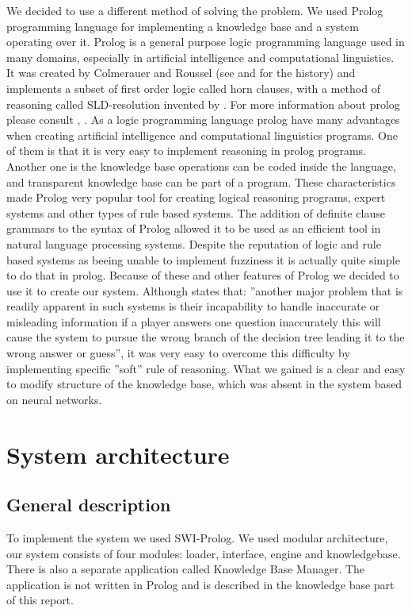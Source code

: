 \documentclass[a4paper]{article}
\begin{document}
We decided to use a different method of solving the problem. We used Prolog programming language for implementing a knowledge base and a system operating over it. Prolog is a general purpose logic programming language used in many domains, especially in artificial intelligence and computational linguistics. It was created by Colmerauer and Roussel (see \citet{Prolog} and \citet{LogicProgramming} for the history) and implements a subset of first order logic called horn clauses, with a method of reasoning called SLD-resolution invented by \citet{SLD}. For more information about prolog please consult \citet{ProgrammingInProlog}, \citet{PrologAI}. As a logic programming language prolog have many advantages when creating artificial intelligence and computational linguistics programs. One of them is that it is very easy to implement reasoning in prolog programs. Another one is the knowledge base operations can be coded inside the language, and transparent knowledge base can be part of a program. These characteristics made Prolog very popular tool for creating logical reasoning programs, expert systems and other types of rule based systems. The addition of definite clause grammars to the syntax of Prolog allowed it to be used as an efficient tool in natural language processing systems. Despite the reputation of logic and rule based systems as beeing unable to implement fuzziness it is actually quite simple to do that in prolog. Because of these and other features of Prolog we decided to use it to create our system. Although \citet{20Q} states that: ''another major problem that is readily apparent in such systems is their incapability to handle inaccurate or misleading information if a player answers one question inaccurately this will cause the system to pursue the wrong branch of the decision tree leading it to the wrong answer or guess'', it was very easy to overcome this difficulty by implementing specific ''soft'' rule of reasoning. What we gained is a clear and easy to modify structure of the knowledge base, which was absent in the system based on neural networks.
\section{System architecture}
\subsection{General description}
To implement the system we used SWI-Prolog. We used modular architecture, our system consists of four modules: loader, interface, engine and knowledgebase. There is also a separate application called Knowledge Base Manager. The application is not written in Prolog and is described in the knowledge base part of this report.
\end{document}
